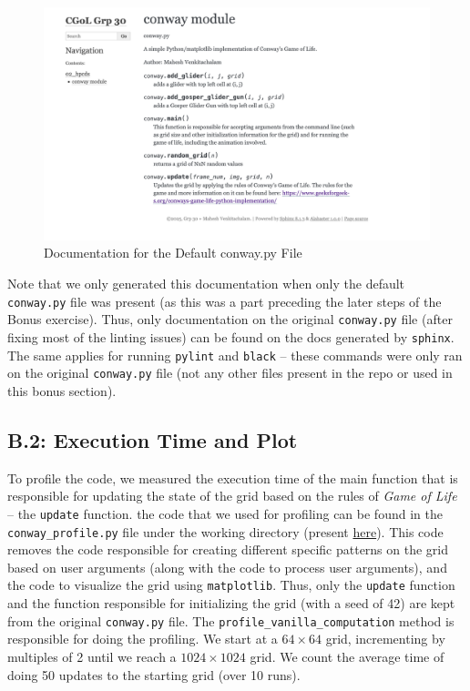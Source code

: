\documentclass[a4paper,12pt]{article}
\begin{document}
\begin{figure}[h!]
  \centering
  \includegraphics[width=\textwidth]{images/conway_documentation_example.png}
  \caption{Documentation for the Default conway.py File}
  \label{fig:conway_docs}
\end{figure}

Note that we only generated this documentation when only the default \verb|conway.py| file was present (as this was a part preceding the later steps of the Bonus exercise). Thus, only documentation on  the original \verb|conway.py| file (after fixing most of the linting issues) can be found on the docs generated by \verb|sphinx|. The same applies for running \verb|pylint| and \verb|black| -- these commands were only ran on the original \verb|conway.py| file (not any other files present in the repo or used in this bonus section).

\subsection{B.2: Execution Time and Plot}
To profile the code, we measured the execution time of the main function that is responsible for updating the state of the grid based on the rules of \textit{Game of Life} -- the \verb|update| function. the code that we used for profiling can be found in the \verb|conway_profile.py| file under the working directory (present \href{https://github.com/paulmyr/DD2358-HPC25/blob/master/02_hpcds/bonus/conway_profile.py}{here}). This code removes the code responsible for creating different specific patterns on the grid based on user arguments (along with the code to process user arguments), and the code to visualize the grid using \verb|matplotlib|. Thus, only the \verb|update| function and the function responsible for initializing the grid (with a seed of 42) are kept from the original \verb|conway.py| file. The \verb|profile_vanilla_computation| method is responsible for doing the profiling. We start at a $64 \times 64$ grid, incrementing by multiples of 2 until we reach a $1024 \times 1024$ grid. We count the average time of doing 50 updates to the starting grid (over 10 runs). 
\end{document}
